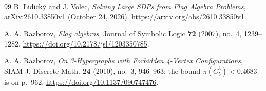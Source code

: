 \documentclass[11pt]{article}
\newcommand{\Cfive}{C_5^3}
\begin{document}
\begin{thebibliography}{99}
B. Lidick\'y and J. Volec,
\emph{Solving Large SDPs from Flag Algebra Problems},
arXiv:2610.33850v1 (October 24, 2026).
\url{https://arxiv.org/abs/2610.33850v1}.

A. A. Razborov,
\emph{Flag algebras},
Journal of Symbolic Logic \textbf{72} (2007), no.~4, 1239--1282.
\url{https://doi.org/10.2178/jsl/1203350785}.

A. A. Razborov,
\emph{On 3-Hypergraphs with Forbidden 4-Vertex Configurations},
SIAM J. Discrete Math. \textbf{24} (2010), no.~3, 946--963;
the bound $\pi(\Cfive)<0.4683$ is on p.~962.
\url{https://doi.org/10.1137/090747476}.
\end{thebibliography}
\end{document}
